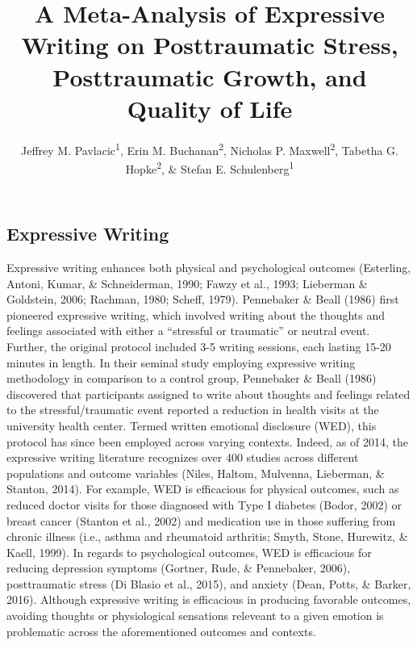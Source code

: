 \documentclass[man]{apa6}
\title{A Meta-Analysis of Expressive Writing on Posttraumatic Stress,
Posttraumatic Growth, and Quality of Life}
\author{Jeffrey M. Pavlacic\textsuperscript{1}, Erin M. Buchanan\textsuperscript{2}, Nicholas P. Maxwell\textsuperscript{2}, Tabetha G. Hopke\textsuperscript{2}, \& Stefan E. Schulenberg\textsuperscript{1}}
\affiliation{
    \vspace{0.5cm}
          \textsuperscript{1} University of Mississippi\\
          \textsuperscript{2} Missouri State University  }
\theoremstyle{definition}
\theoremstyle{definition}
\theoremstyle{definition}
\theoremstyle{remark}
\begin{document}
\maketitle

\setcounter{secnumdepth}{0}



\subsection{Expressive Writing}\label{expressive-writing}

Expressive writing enhances both physical and psychological outcomes
(Esterling, Antoni, Kumar, \& Schneiderman, 1990; Fawzy et al., 1993;
Lieberman \& Goldstein, 2006; Rachman, 1980; Scheff, 1979). Pennebaker
\& Beall (1986) first pioneered expressive writing, which involved
writing about the thoughts and feelings associated with either a
\enquote{stressful or traumatic} or neutral event. Further, the original
protocol included 3-5 writing sessions, each lasting 15-20 minutes in
length. In their seminal study employing expressive writing methodology
in comparison to a control group, Pennebaker \& Beall (1986) discovered
that participants assigned to write about thoughts and feelings related
to the stressful/traumatic event reported a reduction in health visits
at the university health center. Termed written emotional disclosure
(WED), this protocol has since been employed across varying contexts.
Indeed, as of 2014, the expressive writing literature recognizes over
400 studies across different populations and outcome variables (Niles,
Haltom, Mulvenna, Lieberman, \& Stanton, 2014). For example, WED is
efficacious for physical outcomes, such as reduced doctor visits for
those diagnosed with Type I diabetes (Bodor, 2002) or breast cancer
(Stanton et al., 2002) and medication use in those suffering from
chronic illness (i.e., asthma and rheumatoid arthritis; Smyth, Stone,
Hurewitz, \& Kaell, 1999). In regards to psychological outcomes, WED is
efficacious for reducing depression symptoms (Gortner, Rude, \&
Pennebaker, 2006), posttraumatic stress (Di Blasio et al., 2015), and
anxiety (Dean, Potts, \& Barker, 2016). Although expressive writing is
efficacious in producing favorable outcomes, avoiding thoughts or
physiological sensations releveant to a given emotion is problematic
across the aforementioned outcomes and contexts.
\end{document}
